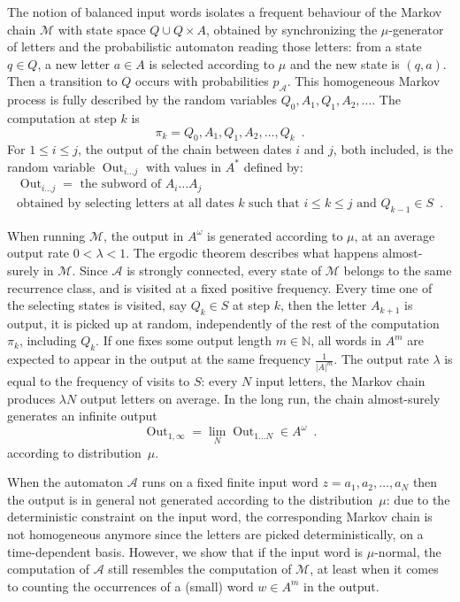\documentclass[11pt]{article}
\newcommand{\A}{\mathcal{A}}
\newcommand{\M}{\mathcal{M}}
\newcommand{\NN}{\mathbb{N}}
\DeclareMathOperator{\outp}{Out}
\begin{document}
The notion of balanced input words
isolates a frequent behaviour 
of the Markov chain $\M$ with state space $Q \cup Q\times A$,
obtained by synchronizing the $\mu$-generator of letters and the probabilistic automaton
reading those letters:
from a state $q\in Q$, a new letter $a \in A$ is selected according to $\mu$
 and the new state is $(q,a)$. Then a transition to $Q$ occurs with probabilities $p_\A$.
This homogeneous Markov process is fully described by the random variables $Q_0,A_1,Q_1,A_2,\ldots$.
The computation at step $k$ is
\[
\pi_k = Q_0,A_1,Q_1,A_2,\ldots  ,Q_k\enspace.
\]
For $1\leq i \leq j$, the output of the chain between dates $i$  and $j$, both included, is the random variable $\outp_{i\ldots j}$ with values in $A^*$ defined by:
\begin{multline*}
\outp_{i\ldots j} =  \text{ the subword of $A_i\ldots A_{j}$} \\
\text{obtained by selecting letters at all dates $k$ such that $i \leq k \leq j$ and $Q_{k-1}\in S$}\enspace.
\end{multline*}

When running $\M$,
the output in $A^\omega$
is generated according to $\mu$, at an average output rate $0 < \lambda < 1$.
The ergodic theorem describes what happens almost-surely in $\M$.
Since $\A$ is strongly connected,
every state of $\M$ belongs to the same recurrence class,
and is visited at a fixed positive frequency.
Every time one of the selecting states is visited, say $Q_k \in S$ at step $k$,
then the letter $A_{k+1}$ is output,
it is picked up at random,
independently of the rest of the computation $\pi_k$,
including $Q_k$.
If one fixes some output length $m\in \NN$,
all words in $A^m$ are expected to appear
in the output at the same frequency $\frac{1}{|A|^m}$.
The output rate $\lambda$ is
equal to the frequency of visits to $S$: 
every $N$ input letters, the Markov chain produces
$\lambda N$ output letters on average.
In the long run, the chain almost-surely generates an infinite output 
\[
\outp_{1,\infty} = \lim_N \outp_{1\ldots N} \in A^\omega\enspace.
\]
according to distribution~$\mu$.

When the automaton $\A$ runs on a fixed finite input word $z=a_1,a_2,\ldots,a_N$
then the output is in general not generated according to the distribution~$\mu$: due to the deterministic constraint on the input word,
the corresponding Markov chain is not homogeneous anymore since the letters are picked deterministically, on a time-dependent basis.
However, we show that if the input word is $\mu$-normal,
the computation of $\A$ still resembles 
the computation of $\M$,
at least when it comes to counting the occurrences
of a (small) word $w\in A^m$  in the output.
\end{document}
